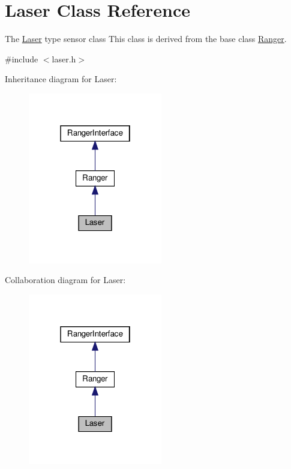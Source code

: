\hypertarget{classLaser}{}\section{Laser Class Reference}
\label{classLaser}


The \hyperlink{classLaser}{Laser} type sensor class This class is derived from the base class \hyperlink{classRanger}{Ranger}.  




{\ttfamily \#include $<$laser.\+h$>$}



Inheritance diagram for Laser\+:\nopagebreak
\begin{figure}[H]
\begin{center}
\leavevmode
\includegraphics[width=166pt]{classLaser__inherit__graph}
\end{center}
\end{figure}


Collaboration diagram for Laser\+:\nopagebreak
\begin{figure}[H]
\begin{center}
\leavevmode
\includegraphics[width=166pt]{classLaser__coll__graph}
\end{center}
\end{figure}
